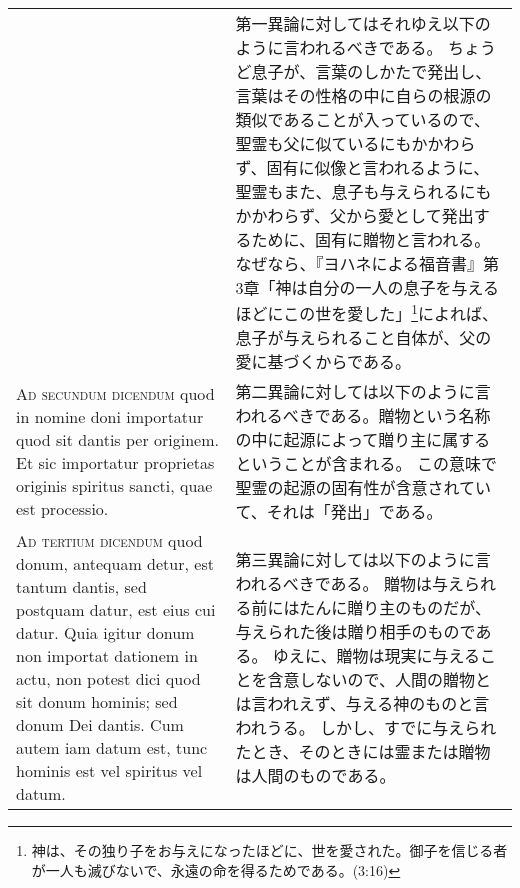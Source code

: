 \documentclass[10pt]{jsarticle} %
\begin{document}
\begin{longtable}{p{21em}p{21em}}
&

第一異論に対してはそれゆえ以下のように言われるべきである。
ちょうど息子が、言葉のしかたで発出し、言葉はその性格の中に自らの根源の類似であることが入っているので、聖霊も父に似ているにもかかわらず、固有に似像と言われるように、聖霊もまた、息子も与えられるにもかかわらず、父から愛として発出するために、固有に贈物と言われる。
なぜなら、『ヨハネによる福音書』第3章「神は自分の一人の息子を与えるほどにこの世を愛した」\footnote{神は、その独り子をお与えになったほどに、世を愛された。御子を信じる者が一人も滅びないで、永遠の命を得るためである。(3:16)}によれば、息子が与えられること自体が、父の愛に基づくからである。

\\

\textsc{Ad secundum dicendum} quod in nomine doni importatur quod sit dantis per
originem. Et sic importatur proprietas originis spiritus sancti, quae est
processio.


&

第二異論に対しては以下のように言われるべきである。贈物という名称の中に起源によって贈り主に属するということが含まれる。
この意味で聖霊の起源の固有性が含意されていて、それは「発出」である。
\\

\textsc{Ad tertium dicendum} quod donum, antequam detur, est tantum dantis, sed postquam
datur, est eius cui datur. Quia igitur donum non importat dationem in actu, non
potest dici quod sit donum hominis; sed donum Dei dantis. Cum autem iam datum
est, tunc hominis est vel spiritus vel datum.


&

第三異論に対しては以下のように言われるべきである。
贈物は与えられる前にはたんに贈り主のものだが、与えられた後は贈り相手のものである。
ゆえに、贈物は現実に与えることを含意しないので、人間の贈物とは言われえず、与える神のものと言われうる。
しかし、すでに与えられたとき、そのときには霊または贈物は人間のものである。
\\

\end{longtable}
\end{document}
